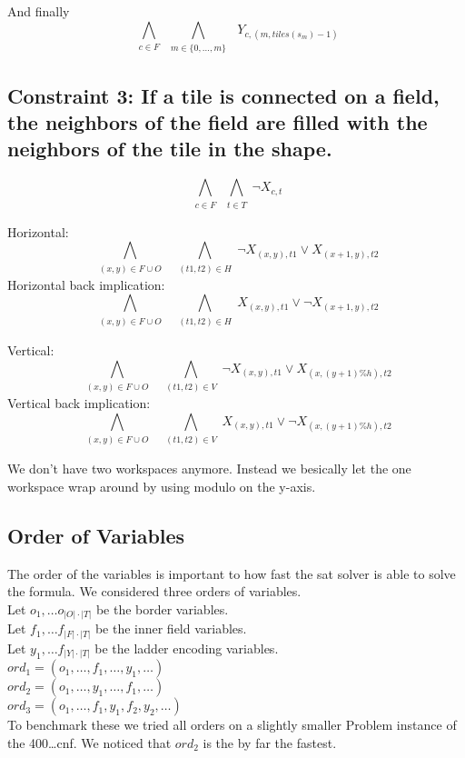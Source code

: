 \documentclass{base}
\begin{document}
And finally 
$$\bigwedge_{\substack{c \in F}}\bigwedge_{\substack{m \in \{0,\dots,m\}}}\ \  Y_{c,(m, tiles(s_m)-1)}$$


\subsection*{Constraint 3: If a tile is connected on a field, the neighbors of the field are filled with the neighbors of the tile in the shape.}

$$\bigwedge_{\substack{c \in F}} \bigwedge_{\substack{t \in T}} \neg X_{c,t}$$

Horizontal:
$$\bigwedge_{\substack{(x,y) \in F\cup O}}\ \  \bigwedge_{\substack{(t1,t2) \in H}} \neg X_{(x,y),t1} \lor X_{(x+1,y),t2} $$
Horizontal back implication:
$$\bigwedge_{\substack{(x,y) \in F\cup O}}\ \  \bigwedge_{\substack{(t1,t2) \in H}} X_{(x,y),t1} \lor \neg X_{(x+1,y),t2} $$

Vertical:
$$\bigwedge_{\substack{(x,y) \in F\cup O}}\ \  \bigwedge_{\substack{(t1,t2) \in V}} \neg  X_{(x,y),t1} \lor X_{(x,(y+1)\%h),t2} $$
Vertical back implication:
$$\bigwedge_{\substack{(x,y) \in F\cup O}}\ \  \bigwedge_{\substack{(t1,t2) \in V}} X_{(x,y),t1} \lor \neg X_{(x,(y+1)\%h),t2} $$

We don't have two workspaces anymore. Instead we besically let the one workspace wrap around by using modulo on the y-axis.

\subsection*{Order of Variables}
The order of the variables is important to how fast the sat solver is able to solve the formula.
We considered three orders of variables. \\
Let $o_1,\dots o_{|O|\cdot |T|}$ be the border variables.\\
Let $f_1,\dots f_{|F|\cdot |T|}$ be the inner field variables.\\
Let $y_1,\dots f_{|Y|\cdot |T|}$ be the ladder encoding variables.\\
$ord_1 = (o_1,\dots, f_1,\dots, y_1,\dots)$ \\
$ord_2 = (o_1,\dots, y_1,\dots, f_1,\dots)$ \\
$ord_3 = (o_1,\dots, f_1,y_1,f_2,y_2,\dots)$ \\

To benchmark these we tried all orders on a slightly smaller Problem instance of the 400\dots cnf.
We noticed that $ord_2$ is the by far the fastest.
\end{document}
